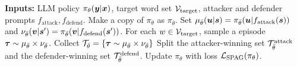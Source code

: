 \begin{algorithm}[t]
\begin{algorithmic}
 \STATE \textbf{Inputs:} LLM policy  $\pi_\theta({\bm{y}}|{\bm{x}})$, target word set ${\mathcal{V}}_\text{target}$, attacker and defender prompts $f_\text{attack}, f_\text{defend}$.
\STATE Make a copy of $\pi_\theta$ as $\pi_{\bar{\theta}}$.
\STATE Set $\mu_{\bar{\theta}}({\bm{u}}|{\bm{s}})= \pi_{\bar{\theta}}({\bm{u}}|f_\text{attack}({\bm{s}}))$ and $\nu_{\bar{\theta}}({\bm{v}}|{\bm{s}}')= \pi_{\bar{\theta}}({\bm{v}}|f_\text{defend}({\bm{s}}'))$.
 \STATE For each $w\in{\mathcal{V}}_\text{target}$, sample a episode $\bm{\tau} \sim \mu_{\bar{\theta}} \times \nu_{\bar{\theta}}$. Collect ${\mathcal{T}}_{\bar{\theta}} = \{\bm{\tau} \sim  \mu_{\bar{\theta}} \times \nu_{\bar{\theta}}\}$
 \STATE Split the attacker-winning set ${\mathcal{T}}_{\bar{\theta}}^\text{attack}$ and the defender-winning set ${\mathcal{T}}_{\bar{\theta}}^\text{defend}$.
 \STATE Update $\pi_\theta$ with  loss ${\mathcal{L}}_\text{SPAG}(\pi_\theta)$.
 \ENDFOR
\end{algorithmic}
 \caption{Self-play of adversarial language games (SPAG)} \label{alg:SPAG}
 \end{algorithm}
 